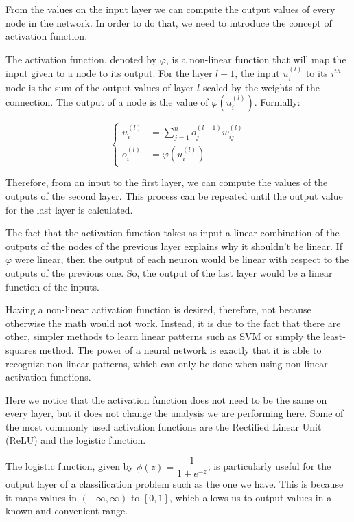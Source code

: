 From the values on the input layer we can compute the output values of every node in the network.
In order to do that, we need to introduce the concept of activation function.

The activation function, denoted by $\varphi$, is a non-linear function that will map the input given to a node to its output.
For the layer $l+1$, the input $u^{(l)}_i$ to its $i^{th}$ node is the sum of the output values of layer $l$ scaled by the weights of the connection.
The output of a node is the value of $\varphi\left(u^{(l)}_i\right)$.
Formally:

\begin{equation}
    \begin{cases}
        u^{(l)}_i &= \sum_{j=1}^{n}o^{(l-1)}_j w^{(l)}_{ij} \\
        o^{(l)}_i &= \varphi\left(u^{(l)}_i\right)
    \end{cases}
\end{equation}

Therefore, from an input to the first layer, we can compute the values of the outputs of the second layer.
This process can be repeated until the output value for the last layer is calculated.

The fact that the activation function takes as input a linear combination of the outputs of the nodes of the previous layer explains why it shouldn't be linear.
If $\varphi$ were linear, then the output of each neuron would be linear with respect to the outputs of the previous one.
So, the output of the last layer would be a linear function of the inputs.

Having a non-linear activation function is desired, therefore, not because otherwise the math would not work.
Instead, it is due to the fact that there are other, simpler methods to learn linear patterns such as SVM or simply the least-squares method.
The power of a neural network is exactly that it is able to recognize non-linear patterns, which can only be done when using non-linear activation functions.

Here we notice that the activation function does not need to be the same on every layer, but it does not change the analysis we are performing here.
Some of the most commonly used activation functions are the Rectified Linear Unit (ReLU) and the logistic function.

The logistic function, given by $\phi(z) = \dfrac{1}{1+e^{-z}}$, is particularly useful for the output layer of a classification problem such as the one we have.
This is because it maps values in $(-\infty, \infty)$ to $[0,1]$, which allows us to output values in a known and convenient range.

